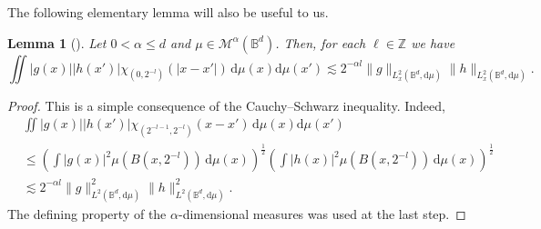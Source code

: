 \documentclass[a4paper]{amsart}
\numberwithin{equation}{section}%
\theoremstyle{plain}%
\newtheorem{lemma}[theorem]{Lemma}
\theoremstyle{definition}
\theoremstyle{remark}%
\def\d{\mathrm{d}}
\begin{document}
The following elementary lemma will also be useful to us.
\begin{lemma}[\cite{ChoShiraki}]
\label{l:Young}
Let $0 < \alpha \leq d$ and $\mu\in \mathcal M^\alpha(\mathbb B^d)$. Then, for each $\ell\in\mathbb Z$ we have
\[
 \iint |g(x)| |h(x')| \chi_{(0,2^{-l})}(|x-x'|)\,  \d \mu(x) \d \mu(x') 
\lesssim 
2^{-\alpha l}\|g\|_{L_x^2(\mathbb B^d,\d\mu) }\|h\|_{L_x^2(\mathbb B^d, \d\mu)}.
\]
\end{lemma}
\begin{proof}
This is a simple consequence of the Cauchy--Schwarz inequality. Indeed, 
\begin{align*}
    &\iint |g(x)| |h(x')|\chi_{(2^{-l-1},2^{-l})}(x-x')\,\d\mu(x)\d\mu(x')\\
    &\leq
    \left(
    \int|g(x)|^2\mu(B(x,2^{-l}))\,\d\mu(x)
    \right)^\frac12
    \left(
    \int|h(x)|^2\mu(B(x,2^{-l}))\,\d\mu(x)
    \right)^\frac12\\
    &\lesssim
    2^{-\alpha l}\|g\|_{L^2(\mathbb B^d, \d\mu)}^2\|h\|_{L^2(\mathbb B^d, \d\mu)}^2.
\end{align*}
The defining property of the $\alpha$-dimensional measures was used at the last step. 
\end{proof}
\end{document}
